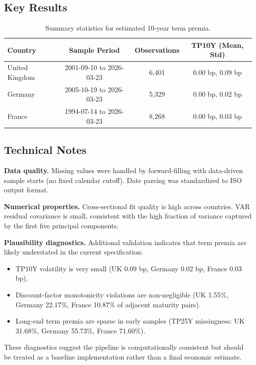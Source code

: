 \subsection{Key Results}

\begin{table}[h!]
\centering
\begin{tabular}{lccc}
\hline
Country & Sample Period & Observations & TP10Y (Mean, Std) \\
\hline
United Kingdom & 2001-09-10 to 2026-03-23 & 6,401 & 0.00 bp, 0.09 bp \\
Germany & 2005-10-19 to 2026-03-23 & 5,329 & 0.00 bp, 0.02 bp \\
France & 1994-07-14 to 2026-03-23 & 8,268 & 0.00 bp, 0.03 bp \\
\hline
\end{tabular}
\caption{Summary statistics for estimated 10-year term premia.}
\end{table}

\subsection{Technical Notes}

\textbf{Data quality.}
Missing values were handled by forward-filling with data-driven sample starts (no fixed calendar cutoff). Date parsing was standardized to ISO output format.

\textbf{Numerical properties.}
Cross-sectional fit quality is high across countries. VAR residual covariance is small, consistent with the high fraction of variance captured by the first five principal components.

\textbf{Plausibility diagnostics.}
Additional validation indicates that term premia are likely understated in the current specification:
\begin{itemize}
  \item TP10Y volatility is very small (UK 0.09 bp, Germany 0.02 bp, France 0.03 bp).
  \item Discount-factor monotonicity violations are non-negligible (UK 1.55\%, Germany 22.17\%, France 10.87\% of adjacent maturity pairs).
  \item Long-end term premia are sparse in early samples (TP25Y missingness: UK 31.68\%, Germany 55.73\%, France 71.60\%).
\end{itemize}
These diagnostics suggest the pipeline is computationally consistent but should be treated as a baseline implementation rather than a final economic estimate.

